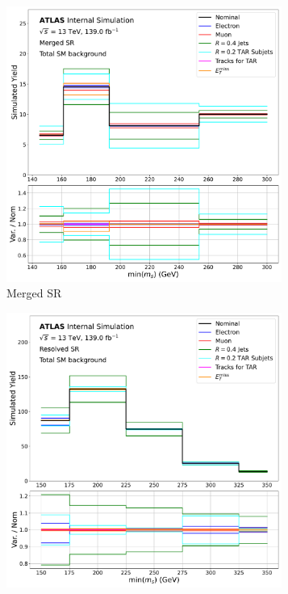\begin{figure}[htbp]
  \centering
    \begin{subfigure}[t]{0.48\textwidth}
    \centering
     \includegraphics[width = 0.99\textwidth]{Figures/6/exp_systs_total_bkg_SR_mgd_TARJets10_minmS_mgd.pdf}
    \caption{Merged SR}
    \end{subfigure}
    \begin{subfigure}[t]{0.48\textwidth}
    \centering
     \includegraphics[width = 0.99\textwidth]{Figures/6/exp_systs_total_bkg_SR_res_TARJets10_minmS_res.pdf}

\end{subfigure}
\end{figure}
